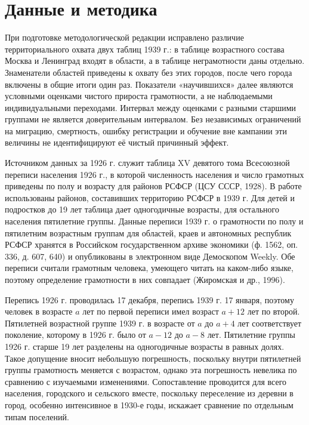 \documentclass[12pt]{article}
\makeatletter
\newcommand{\N}[1]{\@ifundefined{num@#1}{\textbf{[#1]}}{\@nameuse{num@#1}}}
\makeatother
\begin{document}
\section{Данные и методика}

При подготовке методологической редакции исправлено различие территориального охвата двух таблиц 1939 г.: в таблице возрастного состава Москва и Ленинград входят в области, а в таблице неграмотности даны отдельно. Знаменатели областей приведены к охвату без этих городов, после чего города включены в общие итоги один раз. Показатели «научившихся» далее являются условными оценками чистого прироста грамотности, а не наблюдаемыми индивидуальными переходами. Интервал между оценками с разными старшими группами не является доверительным интервалом. Без независимых ограничений на миграцию, смертность, ошибку регистрации и обучение вне кампании эти величины не идентифицируют её чистый причинный эффект.


Источником данных за 1926 г. служит таблица XV девятого тома Всесоюзной переписи населения 1926 г., в которой численность населения и число грамотных приведены по полу и возрасту для районов РСФСР (ЦСУ СССР, 1928). В работе использованы \N{cp.regions} районов, составивших территорию РСФСР в 1939 г. Для детей и подростков до 19 лет таблица дает одногодичные возрасты, для остального населения пятилетние группы. Данные переписи 1939 г. о грамотности по полу и пятилетним возрастным группам для областей, краев и автономных республик РСФСР хранятся в Российском государственном архиве экономики (ф. 1562, оп. 336, д. 607, 640) и опубликованы в электронном виде Демоскопом Weekly. Обе переписи считали грамотным человека, умеющего читать на каком-либо языке, поэтому определение грамотности в них совпадает (Жиромская и др., 1996).

Перепись 1926 г. проводилась 17 декабря, перепись 1939 г. 17 января, поэтому человек в возрасте $a$ лет по первой переписи имел возраст $a+12$ лет по второй. Пятилетней возрастной группе 1939 г. в возрасте от $a$ до $a+4$ лет соответствует поколение, которому в 1926 г. было от $a-12$ до $a-8$ лет. Пятилетние группы 1926 г. старше 19 лет разделены на одногодичные возрасты в равных долях. Такое допущение вносит небольшую погрешность, поскольку внутри пятилетней группы грамотность меняется с возрастом, однако эта погрешность невелика по сравнению с изучаемыми изменениями. Сопоставление проводится для всего населения, городского и сельского вместе, поскольку переселение из деревни в город, особенно интенсивное в 1930-е годы, искажает сравнение по отдельным типам поселений.
\end{document}
